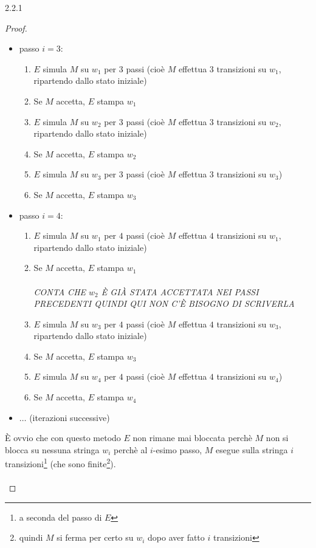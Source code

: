 \documentclass{article}  %
\theoremstyle{definition}
\begin{document}
\begin{theorem}{2.2.1}
\begin{proof}
\begin{itemize}
\begin{enumerate}
			      \end{enumerate}
			\item passo $i=3$:
			      \begin{enumerate}
				      \item $E$ simula $M$ su $w_1$ per $3$ passi (cioè $M$ effettua $3$ transizioni su $w_1$, ripartendo dallo stato iniziale)
				      \item Se $M$ accetta, $E$ stampa $w_1$
				      \item $E$ simula $M$ su $w_2$ per $3$ passi (cioè $M$ effettua $3$ transizioni su $w_2$, ripartendo dallo stato iniziale)
				      \item Se $M$ accetta, $E$ stampa $w_2$
				      \item $E$ simula $M$ su $w_3$ per $3$ passi (cioè $M$ effettua $3$ transizioni su $w_3$)
				      \item Se $M$ accetta, $E$ stampa $w_3$
			      \end{enumerate}
			\item passo $i=4$:
			      \begin{enumerate}
				      \item $E$ simula $M$ su $w_1$ per $4$ passi (cioè $M$ effettua $4$ transizioni su $w_1$, ripartendo dallo stato iniziale)
				      \item Se $M$ accetta, $E$ stampa $w_1$ \\ \\
				            \textit{CONTA CHE $w_2$ È GIÀ STATA ACCETTATA NEI PASSI PRECEDENTI QUINDI QUI NON C'È BISOGNO DI SCRIVERLA} \\
				      \item $E$ simula $M$ su $w_3$ per $4$ passi (cioè $M$ effettua $4$ transizioni su $w_3$, ripartendo dallo stato iniziale)
				      \item Se $M$ accetta, $E$ stampa $w_3$
				      \item $E$ simula $M$ su $w_4$ per $4$ passi (cioè $M$ effettua $4$ transizioni su $w_4$)
				      \item Se $M$ accetta, $E$ stampa $w_4$
			      \end{enumerate}
			\item $\dots$ (iterazioni successive)
		\end{itemize}
		È ovvio che con questo metodo $E$ non rimane mai bloccata perchè $M$ non si blocca su nessuna stringa $w_i$ perchè al $i$-esimo passo, $M$ esegue sulla stringa $i$ transizioni\footnote{a seconda
			del passo di $E$} (che sono finite\footnote{quindi $M$ si ferma per certo su $w_i$ dopo aver fatto $i$ transizioni}). \\ \\

\end{proof}
\end{theorem}
\end{document}
